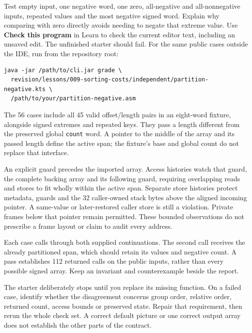Test empty input, one negative word, one zero, all-negative and all-nonnegative
inputs, repeated values and the most negative signed word. Explain why comparing
with zero directly avoids needing to negate that extreme value. Use \textbf{Check this program} in Learn to check the current editor text,
including an unsaved edit. The unfinished starter should fail. For the same
public cases outside the IDE, run from the repository root:
\begin{verbatim}
java -jar /path/to/cli.jar grade \
  revision/lessons/009-sorting-costs/independent/partition-negative.kts \
  /path/to/your/partition-negative.asm
\end{verbatim}
The 56 cases include all 45 valid offset/length pairs in an eight-word fixture,
alongside signed extremes and repeated keys. They pass a length different from
the preserved global \texttt{count} word. A pointer to the middle of the array
and its passed length define the active span; the fixture's base and global
count do not replace that interface.

An explicit guard precedes the imported array. Access histories watch that
guard, the complete backing array and its following guard, requiring overlapping
reads and stores to fit wholly within the active span. Separate store histories
protect metadata, guards and the 32 caller-owned stack bytes above the aligned
incoming pointer. A same-value or later-restored caller store is still a
violation. Private frames below that pointer remain permitted. These bounded
observations do not prescribe a frame layout or claim to audit every address.

Each case calls through both supplied continuations. The second call receives
the already partitioned span, which should retain its values and negative
count. A pass establishes 112 returned calls on the public inputs, rather than
every possible signed array. Keep an invariant and counterexample beside the
report.

The starter deliberately stops until you replace its missing function. On a failed
case, identify whether the disagreement concerns group order, relative order,
returned count, access bounds or preserved state. Repair that requirement, then
rerun the whole check set. A correct default picture or one correct output array
does not establish the other parts of the contract.


